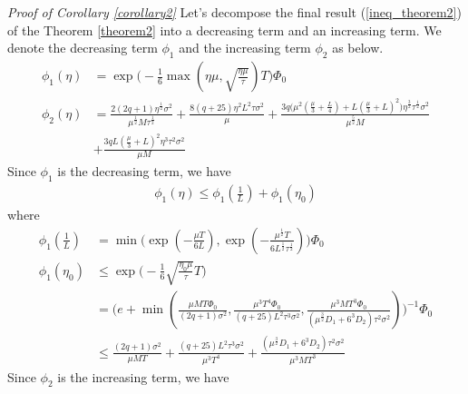 \emph{Proof of Corollary \ref{corollary2}} \textrm{ } Let's decompose the final result (\ref{ineq_theorem2}) of the Theorem \ref{theorem2} into a decreasing term and an increasing term. We denote the decreasing term $\phi_1$ and the increasing term $\phi_2$ as below.
\begin{align*}
    \phi_1(\eta) &= \exp\Big( -\frac{1}{6}\max(\eta\mu, \sqrt{\frac{\eta\mu}{\tau}})T \Big)\Phi_0 \\
    \phi_2(\eta) &= \frac{2(2q+1)\eta^{\frac{1}{2}}\sigma^2}{\mu^{\frac{1}{2}}M\tau^{\frac{1}{2}}} + \frac{8(q+25)\eta^2 L^2\tau\sigma^2}{\mu} + \frac{3q\Big(\mu^2(\frac{\mu}{3}+\frac{L}{4}) + L(\frac{\mu}{3}+L)^2\Big)\eta^{\frac{3}{2}}\tau^{\frac{1}{2}}\sigma^2}{\mu^{\frac{5}{2}}M} \\
    &+ \frac{3qL(\frac{\mu}{3}+L)^2 \eta^3\tau^2\sigma^2}{\mu M}
\end{align*}
Since $\phi_1$ is the decreasing term, we have
\begin{align} \label{ineq_corollary2-1}
    \phi_1(\eta) \leq \phi_1(\frac{1}{L}) + \phi_1(\eta_0)
\end{align}
where
\begin{align*}
    \phi_1(\frac{1}{L}) &= \min \Big( \exp(-\frac{\mu T}{6L}), \exp(-\frac{\mu^{\frac{1}{2}}T}{6 L^{\frac{1}{2}}\tau^{\frac{1}{2}}})\Big) \Phi_0 \\
    \phi_1(\eta_0) &\leq \exp \Big( -\frac{1}{6} \sqrt{\frac{\eta_0 \mu}{\tau}}T\Big) \\
    &= \Big(e+\min(\frac{\mu M T \Phi_0}{(2q+1)\sigma^2}, \frac{\mu^3 T^4\Phi_0}{(q+25)L^2\tau^3\sigma^2}, \frac{\mu^3 M T^3\Phi_0}{(\mu^{\frac{3}{2}}D_1+6^3 D_2)\tau^2\sigma^2}) \Big)^{-1} \Phi_0 \\
    &\leq \frac{(2q+1)\sigma^2}{\mu MT} + \frac{(q+25)L^2\tau^3\sigma^2}{\mu^3 T^4} + \frac{(\mu^{\frac{3}{2}}D_1+6^3 D_2)\tau^2\sigma^2}{\mu^3 M T^3}
\end{align*}
Since $\phi_2$ is the increasing term, we have
